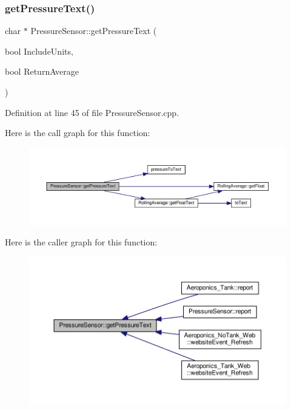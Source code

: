 \subsubsection{\texorpdfstring{get\+Pressure\+Text()}{getPressureText()}\hspace{0.1cm}{\footnotesize\ttfamily [1/2]}}
{\footnotesize\ttfamily char $\ast$ Pressure\+Sensor\+::get\+Pressure\+Text (\begin{DoxyParamCaption}\item[{bool}]{Include\+Units,  }\item[{bool}]{Return\+Average }\end{DoxyParamCaption})}



Definition at line 45 of file Pressure\+Sensor.\+cpp.

Here is the call graph for this function\+:
\nopagebreak
\begin{figure}[H]
\begin{center}
\leavevmode
\includegraphics[width=350pt]{class_pressure_sensor_aa3eccb7d69ba28ff2f5c4688bf13f7e8_cgraph}
\end{center}
\end{figure}
Here is the caller graph for this function\+:
\nopagebreak
\begin{figure}[H]
\begin{center}
\leavevmode
\includegraphics[width=350pt]{class_pressure_sensor_aa3eccb7d69ba28ff2f5c4688bf13f7e8_icgraph}
\end{center}
\end{figure}
\mbox{\label{class_pressure_sensor_a3cb6b01b624b7dc64a083a8cdac58451}} 
